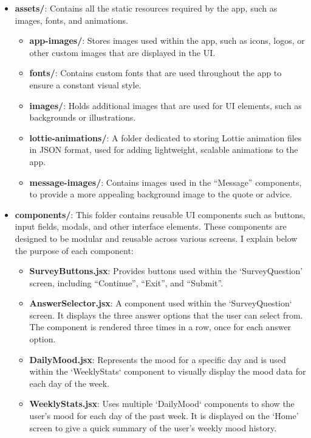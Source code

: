 \begin{itemize}
    \item \textbf{assets/}: Contains all the static resources required by the app, such as images, fonts, and animations.
    \begin{itemize}
        \item \textbf{app-images/}: Stores images used within the app, such as icons, logos, or other custom images that are displayed in the UI.
        \item \textbf{fonts/}: Contains custom fonts that are used throughout the app to ensure a constant visual style.
        \item \textbf{images/}: Holds additional images that are used for UI elements, such as backgrounds or illustrations.
        \item \textbf{lottie-animations/}: A folder dedicated to storing Lottie animation files in JSON format, used for adding lightweight, scalable animations to the app.
        \item \textbf{message-images/}: Contains images used in the ``Message'' components, to provide a more appealing background image to the quote or advice.
    \end{itemize}

    \item \textbf{components/}: This folder contains reusable UI components such as buttons, input fields, modals, and other interface elements. These components are designed to be modular and reusable across various screens. I explain below the purpose of each component:

    \begin{itemize}
        \item \textbf{SurveyButtons.jsx}: Provides buttons used within the `SurveyQuestion' screen, including ``Continue'', ``Exit'', and ``Submit''.
        
        \item \textbf{AnswerSelector.jsx}: A component used within the `SurveyQuestion` screen. It displays the three answer options that the user can select from. The component is rendered three times in a row, once for each answer option.

        \item \textbf{DailyMood.jsx}: Represents the mood for a specific day and is used within the `WeeklyStats` component to visually display the mood data for each day of the week.
        
        \item \textbf{WeeklyStats.jsx}: Uses multiple `DailyMood` components to show the user's mood for each day of the past week. It is displayed on the `Home' screen to give a quick summary of the user’s weekly mood history.
        

\end{itemize}
\end{itemize}
